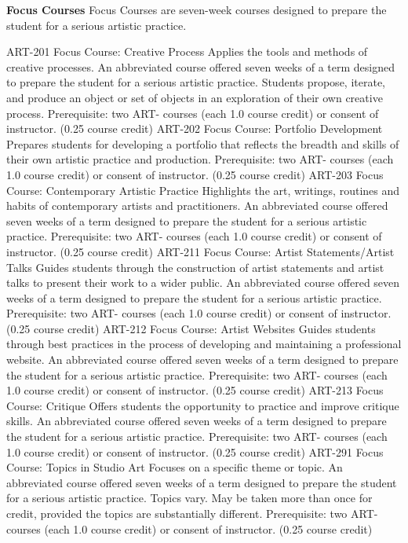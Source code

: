 \documentclass[
  letterpaper,
]{scrbook}
\begin{document}
\textbf{Focus Courses} Focus Courses are seven-week courses designed to
prepare the student for a serious artistic practice.

ART-201 Focus Course: Creative Process Applies the tools and methods of
creative processes. An abbreviated course offered seven weeks of a term
designed to prepare the student for a serious artistic practice.
Students propose, iterate, and produce an object or set of objects in an
exploration of their own creative process. Prerequisite: two ART-
courses (each 1.0 course credit) or consent of instructor. (0.25 course
credit) ART-202 Focus Course: Portfolio Development Prepares students
for developing a portfolio that reflects the breadth and skills of their
own artistic practice and production. Prerequisite: two ART- courses
(each 1.0 course credit) or consent of instructor. (0.25 course credit)
ART-203 Focus Course: Contemporary Artistic Practice Highlights the art,
writings, routines and habits of contemporary artists and practitioners.
An abbreviated course offered seven weeks of a term designed to prepare
the student for a serious artistic practice. Prerequisite: two ART-
courses (each 1.0 course credit) or consent of instructor. (0.25 course
credit) ART-211 Focus Course: Artist Statements/Artist Talks Guides
students through the construction of artist statements and artist talks
to present their work to a wider public. An abbreviated course offered
seven weeks of a term designed to prepare the student for a serious
artistic practice. Prerequisite: two ART- courses (each 1.0 course
credit) or consent of instructor. (0.25 course credit) ART-212 Focus
Course: Artist Websites Guides students through best practices in the
process of developing and maintaining a professional website. An
abbreviated course offered seven weeks of a term designed to prepare the
student for a serious artistic practice. Prerequisite: two ART- courses
(each 1.0 course credit) or consent of instructor. (0.25 course credit)
ART-213 Focus Course: Critique Offers students the opportunity to
practice and improve critique skills. An abbreviated course offered
seven weeks of a term designed to prepare the student for a serious
artistic practice. Prerequisite: two ART- courses (each 1.0 course
credit) or consent of instructor. (0.25 course credit) ART-291 Focus
Course: Topics in Studio Art Focuses on a specific theme or topic. An
abbreviated course offered seven weeks of a term designed to prepare the
student for a serious artistic practice. Topics vary. May be taken more
than once for credit, provided the topics are substantially different.
Prerequisite: two ART- courses (each 1.0 course credit) or consent of
instructor. (0.25 course credit)
\end{document}
